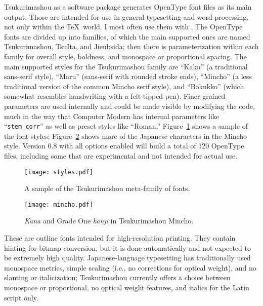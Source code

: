 \documentclass{ltugboat}
\begin{document}
Tsukurimashou as a software package generates
\linebreak%
 OpenType font files as its
main output.  Those are intended for use in general typesetting and word
processing, not only within the \TeX\ world.  I most often use them with
\XeTeX.  The OpenType fonts are divided up into families, of which the main
supported ones are named Tsukurimashou, TsuIta, and Jieubsida; then there is
parameterization within each family for overall style, boldness, and
monospace or proportional spacing.  The main supported styles for the
Tsukurimashou family are ``Kaku'' (a traditional sans-serif style),
``Maru'' (sans-serif with rounded stroke ends),
``Mincho'' (a less traditional version of the common Mincho serif style),
and ``Bokukko'' (which somewhat resembles handwriting with a felt-tipped
pen).  Finer-grained parameters are used internally and could be made
visible by modifying the code, much in the way that Computer Modern has
internal parameters like ``\verb|stem_corr|'' as well as preset styles like
``Roman.'' Figure~\ref{fig:styles} shows a sample of the font styles;
Figure~\ref{fig:mincho} shows more of the Japanese characters in the Mincho
style.  Version 0.8
with all options enabled will build a total of 120 OpenType files, including
some that are experimental and not intended for actual use.

\begin{figure}
\texttt{[image: styles.pdf]}
\caption{A sample of the Tsukurimashou meta-family of fonts.}
\label{fig:styles}
\vskip-2mm%
\end{figure}

\begin{figure}
\texttt{[image: mincho.pdf]}
\caption{\emph{Kana} and Grade One \emph{kanji} in Tsukurimashou Mincho.}
\label{fig:mincho}
\vskip-1mm%
\end{figure}

These are outline fonts intended for 
\linebreak%
high-resolution printing.  They contain
hinting for bitmap conversion, but it is done automatically and not expected
to be extremely high quality. $\!$Japanese-language typesetting has
traditionally used monospace metrics, simple scaling (i.e., no corrections
for optical weight), and no slanting or italicization; Tsukurimashou
currently offers a choice between
\linebreak%
 monospace or proportional, no optical
weight features, and italics for the Latin script only.
\end{document}
